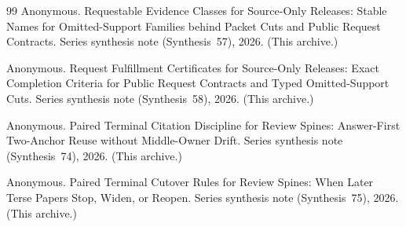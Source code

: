 \documentclass[11pt]{article}
\begin{document}
\begin{thebibliography}{99}
Anonymous.
\newblock Requestable Evidence Classes for Source-Only Releases: Stable Names for Omitted-Support Families behind Packet Cuts and Public Request Contracts.
\newblock Series synthesis note (Synthesis~57), 2026. (This archive.)

Anonymous.
\newblock Request Fulfillment Certificates for Source-Only Releases: Exact Completion Criteria for Public Request Contracts and Typed Omitted-Support Cuts.
\newblock Series synthesis note (Synthesis~58), 2026. (This archive.)



Anonymous.
\newblock Paired Terminal Citation Discipline for Review Spines: Answer-First Two-Anchor Reuse without Middle-Owner Drift.
\newblock Series synthesis note (Synthesis~74), 2026. (This archive.)

Anonymous.
\newblock Paired Terminal Cutover Rules for Review Spines: When Later Terse Papers Stop, Widen, or Reopen.
\newblock Series synthesis note (Synthesis~75), 2026. (This archive.)

\end{thebibliography}
\end{document}
